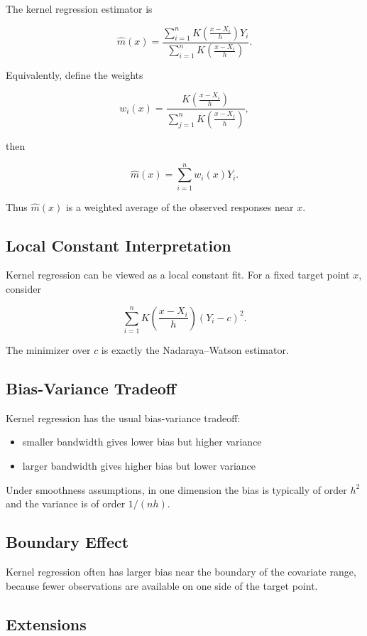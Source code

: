 \documentclass[a4paper,10pt]{article}
\begin{document}
The kernel regression estimator is

\[
\hat m(x)
=
\frac{\sum_{i=1}^n K\left(\frac{x-X_i}{h}\right)Y_i}
{\sum_{i=1}^n K\left(\frac{x-X_i}{h}\right)}.
\]

Equivalently, define the weights

\[
w_i(x)=
\frac{K\left(\frac{x-X_i}{h}\right)}
{\sum_{j=1}^n K\left(\frac{x-X_j}{h}\right)},
\]

then

\[
\hat m(x)=\sum_{i=1}^n w_i(x)Y_i.
\]

Thus $\hat m(x)$ is a weighted average of the observed responses near $x$.

\subsection{Local Constant Interpretation}

Kernel regression can be viewed as a local constant fit. For a fixed target point $x$, consider

\[
\sum_{i=1}^n K\left(\frac{x-X_i}{h}\right)(Y_i-c)^2.
\]

The minimizer over $c$ is exactly the Nadaraya--Watson estimator.

\subsection{Bias-Variance Tradeoff}

Kernel regression has the usual bias-variance tradeoff:

\begin{itemize}
\item smaller bandwidth gives lower bias but higher variance
\item larger bandwidth gives higher bias but lower variance
\end{itemize}

Under smoothness assumptions, in one dimension the bias is typically of order $h^2$ and the variance is of order $1/(nh)$.

\subsection{Boundary Effect}

Kernel regression often has larger bias near the boundary of the covariate range, because fewer observations are available on one side of the target point.

\subsection{Extensions}
\end{document}
